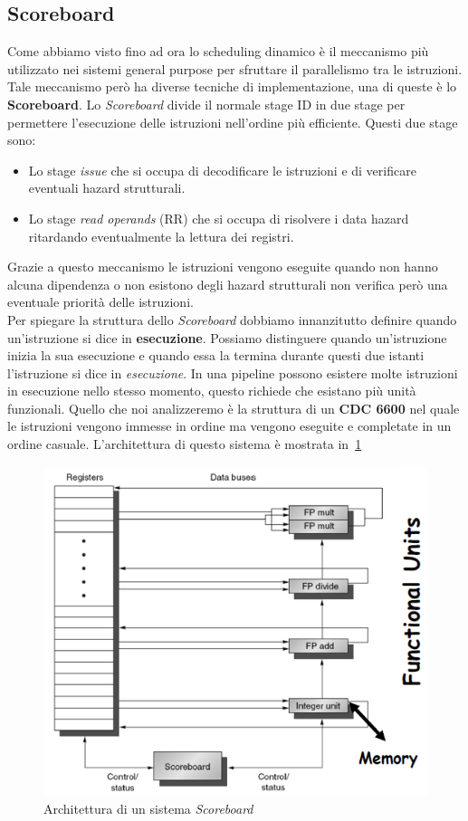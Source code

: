 \subsection{Scoreboard}
Come abbiamo visto fino ad ora lo scheduling dinamico è il meccanismo più utilizzato nei sistemi general purpose per sfruttare il parallelismo tra le istruzioni. Tale meccanismo però ha diverse tecniche di implementazione, una di queste è lo \textbf{Scoreboard}. Lo \emph{Scoreboard} divide il normale stage ID in due stage per permettere l'esecuzione delle istruzioni nell'ordine più efficiente. Questi due stage sono:
\begin{itemize}
\item Lo stage \emph{issue} che si occupa di decodificare le istruzioni e di verificare eventuali hazard strutturali.
\item Lo stage \emph{read operands} (RR) che si occupa di risolvere i data hazard ritardando eventualmente la lettura dei registri.
\end{itemize}
Grazie a questo meccanismo le istruzioni vengono eseguite quando non hanno alcuna dipendenza o non esistono degli hazard strutturali non verifica però una eventuale priorità delle istruzioni.\\
Per spiegare la struttura dello \emph{Scoreboard} dobbiamo innanzitutto definire quando un'istruzione si dice in \textbf{esecuzione}. Possiamo distinguere quando un'istruzione inizia la sua esecuzione e quando essa la termina durante questi due istanti l'istruzione si dice in \emph{esecuzione}. In una pipeline possono esistere molte istruzioni in esecuzione nello stesso momento, questo richiede che esistano più unità funzionali. Quello che noi analizzeremo è la struttura di un \textbf{CDC 6600} nel quale le istruzioni vengono immesse in ordine ma vengono eseguite e completate in un ordine casuale. L'architettura di questo sistema è mostrata in \figurename\,\ref{fig:scorearch}
\begin{figure}[htb]
\centering
\includegraphics[scale=0.5]{img/scorearch.png}
\caption{Architettura di un sistema \emph{Scoreboard}}\label{fig:scorearch}
\end{figure}
